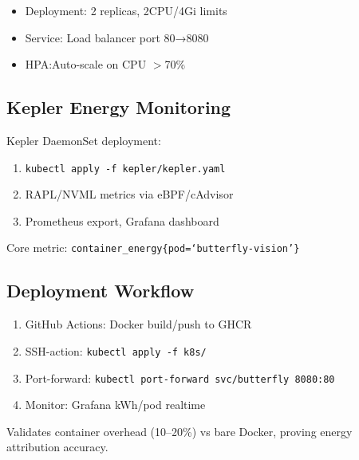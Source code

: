 \begin{itemize}
\item Deployment: 2 replicas, 2CPU/4Gi limits
\item Service: Load balancer port 80→8080
\item HPA:\@ Auto-scale on CPU $>$70\%
\end{itemize}

\subsection{Kepler Energy Monitoring}

Kepler DaemonSet deployment:

\begin{enumerate}
\item \texttt{kubectl apply -f kepler/kepler.yaml}
\item RAPL/NVML metrics via eBPF/cAdvisor
\item Prometheus export, Grafana dashboard
\end{enumerate}

Core metric: \texttt{container\_energy\{pod=`butterfly-vision'\}}

\subsection{Deployment Workflow}

\begin{enumerate}
\item GitHub Actions: Docker build/push to GHCR
\item SSH-action: \texttt{kubectl apply -f k8s/}
\item Port-forward: \texttt{kubectl port-forward svc/butterfly 8080:80}
\item Monitor: Grafana kWh/pod realtime
\end{enumerate}

Validates container overhead (10--20\%) vs bare Docker, proving energy attribution accuracy.\@
